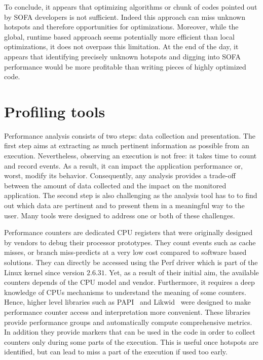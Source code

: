 To conclude, it appears that optimizing algorithms or chunk of codes pointed out by \gls{SOFA} developers is not sufficient.
Indeed this approach can miss unknown hotspots and therefore opportunities for optimizations.
Moreover, while the global, runtime based approach seems potentially more efficient than local optimizations, it does not overpass this limitation.
At the end of the day, it appears that identifying precisely unknown hotspots and digging into \gls{SOFA} performance would be more profitable than writing pieces of highly optimized code.

\section{Profiling tools}
\label{sec:prof-tools}

Performance analysis consists of two steps: data collection and presentation.
The first step aims at extracting as much pertinent information as possible from an execution.
Nevertheless, observing an execution is not free: it takes time to count and record events.
As a result, it can impact the application performance or, worst, modify its behavior.
Consequently, any analysis provides a trade-off between the amount of data collected and the impact on the monitored application.
The second step is also challenging as the analysis tool has to to find out which data are pertinent and to present them in a meaningful way to the user.
Many tools were designed to address one or both of these challenges.

Performance counters are dedicated \gls{CPU} registers that were originally designed by vendors to debug their processor prototypes.
They count events such as cache misses, or branch miss-predicts at a very low cost compared to software based solutions.
They can directly be accessed using the \gls{Perf} driver which is part of the \gls{Linux} kernel since version $2.6.31$.
Yet, as a result of their initial aim, the available counters depends of the \gls{CPU} model and vendor.
Furthermore, it requires a deep knowledge of \glspl{CPU} mechanisms to understand the meaning of some counters.
Hence, higher level libraries such as \gls{PAPI}~\cite{Browne00Portable,Malony11Parallel,Weaver13PAPI} and \gls{Likwid}~\cite{Treibig10LIKWID} were designed to make performance counter access and interpretation more convenient.
These libraries provide performance groups and automatically compute comprehensive metrics.
In addition they provide markers that can be used in the code in order to collect counters only during some parts of the execution.
This is useful once hotspots are identified, but can lead to miss a part of the execution if used too early.

